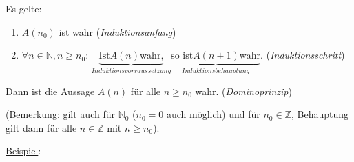 \documentclass[a4paper, 12pt, twoside] {article}
\begin{document}
Es gelte:
\begin{enumerate}
\item $A(n_0)$ ist wahr (\textit{Induktionsanfang})
\item $\forall n \in \mathbb{N}, n \geq n_0$:
$\underbrace{\text{Ist} A(n) \text{wahr,}}_{Induktionsvorraussetzung} \underbrace{\text{so ist} A(n+1) \text{wahr}}_{Induktionsbehauptung}.$ (\textit{Induktionsschritt})
\end{enumerate}

Dann ist die Aussage $A(n)$ für alle $n \geq n_0$ wahr. (\textit{Dominoprinzip})

(\underline{Bemerkung}: gilt auch für $\mathbb{N}_0$ ($n_0 = 0$ auch möglich) und für $n_0 \in \mathbb{Z}$, Behauptung gilt dann für alle $n \in \mathbb{Z}$ mit $n \geq n_0$).

\underline{Beispiel}: 
\end{document}
